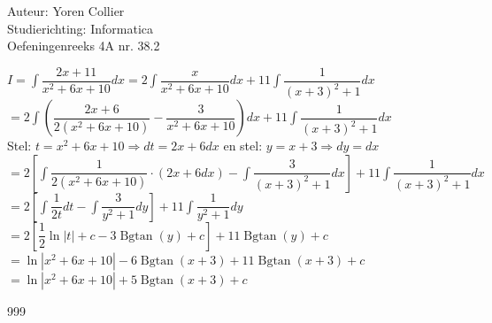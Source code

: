 \documentclass[a4paper]{article}
\newcommand{\adR}{\Rightarrow} %
\newcommand{\Lh}{\left(} %
\newcommand{\Rh}{\right)}
\newcommand{\Lv}{\left[} %
\newcommand{\Rv}{\right]}
\newcommand{\intgrl}{\displaystyle\int} %
\begin{document}
\noindent \large Auteur: Yoren Collier \\
\noindent \large Studierichting: Informatica\\
\noindent \large Oefeningenreeks 4A nr. 38.2\\

\medskip

\normalsize

$ I =  \intgrl \dfrac{2x+11}{x^2 +6x +10} dx = 2\intgrl \dfrac{x}{x^2 +6x +10} dx + 11\intgrl \dfrac{1}{\Lh x+3 \Rh^2 +1} dx$\\

$= 2 \intgrl \Lh \dfrac{2x +6}{2 \Lh x^2 +6x +10 \Rh} - \dfrac{3}{x^2 +6x+ 10} \Rh dx + 11 \intgrl \dfrac{1}{\Lh x+3 \Rh^2 +1} dx$\\

Stel: $t = x^2 +6x +10 \adR dt = 2x +6 dx$ en stel: $y = x +3 \adR dy = dx$\\

$= 2 \Lv \intgrl \dfrac{1}{2 \Lh x^2 +6x +10 \Rh} \cdot \Lh 2x +6 dx \Rh - \intgrl \dfrac{3}{\Lh x+3 \Rh^2 +1 } dx\Rv +11 \intgrl \dfrac{1}{\Lh x+3 \Rh^2 +1 } dx$\\

$= 2 \Lv \intgrl \dfrac{1}{2t} dt - \intgrl \dfrac{3}{y^2 +1} dy\Rv +11 \intgrl \dfrac{1}{y^2 +1} dy$\\

$= 2 \Lv \dfrac{1}{2} \ln |t| +c -3\operatorname{Bgtan} \Lh y \Rh +c \Rv +11 \operatorname{Bgtan} \Lh y \Rh +c$\\

$= \ln |x^2 +6x +10| -6 \operatorname{Bgtan} \Lh x+3 \Rh +11 \operatorname{Bgtan} \Lh x+3 \Rh +c$\\

$= \ln |x^2 +6x +10| +5 \operatorname{Bgtan} \Lh x+3 \Rh +c$\\

\begin{thebibliography}{999}
\end{thebibliography}
\end{document}
